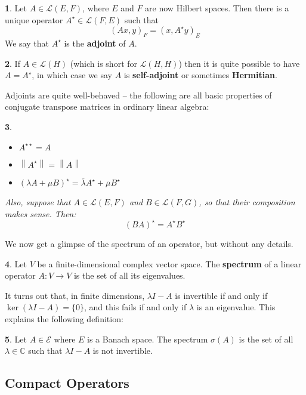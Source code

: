 \documentclass[oneside,english]{amsbook}
\numberwithin{section}{chapter}
\theoremstyle{plain}
\newtheorem{thm}{\protect\theoremname}
\theoremstyle{definition}
\newtheorem{defn}[thm]{\protect\definitionname}
\newcommand{\norm}[1]{\left\lVert#1\right\rVert}
\providecommand{\definitionname}{Definition}
\providecommand{\theoremname}{Theorem}
\begin{document}
\begin{defn}
	Let $A\in \mathscr{L}(E, F)$, where $E$ and $F$ are now Hilbert spaces. Then there is a unique operator $A^\star\in \mathscr{L}(F, E)$ such that
	\[
	(Ax, y)_F = (x, A^\star y)_E
	\]
	We say that $A^\star$ is the \textbf{adjoint} of $A$.
\end{defn}

\begin{defn}
	If $A\in \mathscr{L}(H)$ (which is short for $\mathscr{L}(H, H)$) then it is quite possible to have $A = A^\star$, in which case we say $A$ is \textbf{self-adjoint} or sometimes \textbf{Hermitian}.
\end{defn}

Adjoints are quite well-behaved -- the following are all basic properties of conjugate transpose matrices in ordinary linear algebra:

\begin{thm}
	\begin{itemize}
		\item $A^{\star \star} = A$ 
		\item $\norm{A^\star} = \norm{A}$
			\item $(\lambda A + \mu B)^\star = \overline{\lambda}A^\star + \overline{\mu}B^\star$
		\end{itemize}
		Also, suppose that $A\in \mathscr{L}(E, F)$ and $B\in \mathscr{L}(F, G)$, so that their composition makes sense. Then:
		\[
		(BA)^\star = A^\star B^\star
		\]
\end{thm}

We now get a glimpse of the spectrum of an operator, but without any details.

\begin{defn}
	Let $V$ be a finite-dimensional complex vector space. The \textbf{spectrum} of a linear operator $A: V\to V$ is the set of all its eigenvalues. 
\end{defn}

It turns out that, in finite dimensions, $\lambda I - A$ is invertible if and only if $\ker(\lambda I - A) = \{0\}$, and this fails if and only if $\lambda$ is an eigenvalue. This explains the following definition:

\begin{defn}
	Let $A\in \mathscr{E}$ where $E$ is a Banach space. The spectrum $\sigma(A)$ is the set of all $\lambda\in \mathbb{C}$ such that $\lambda I - A$ is not invertible.
\end{defn}

\subsection{Compact Operators}
\end{document}
